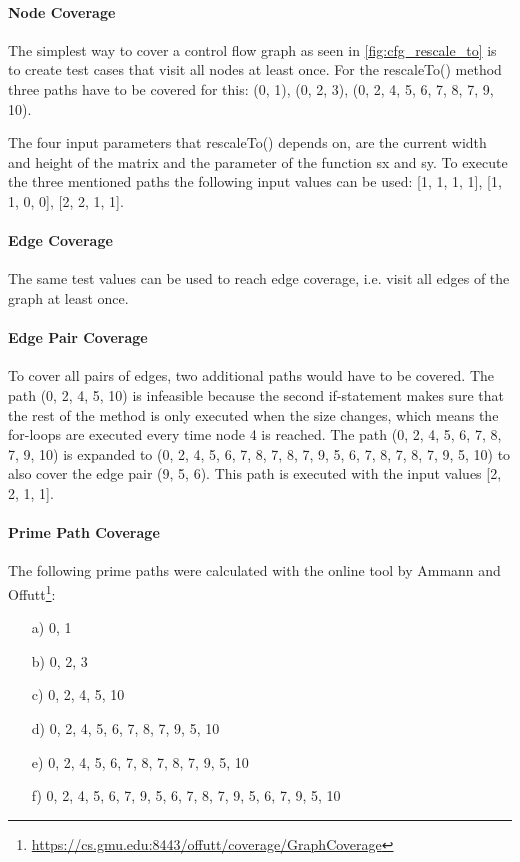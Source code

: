 \documentclass{scrreprt}
\begin{document}
\paragraph{Node Coverage} The simplest way to cover a control flow graph as seen in \vref{fig:cfg_rescale_to} is to create test cases that visit all nodes at least once. For the rescaleTo() method three paths have to be covered for this: (0, 1), (0, 2, 3), (0, 2, 4, 5, 6, 7, 8, 7, 9, 10).

The four input parameters that rescaleTo() depends on, are the current width and height of the matrix and the parameter of the function sx and sy. To execute the three mentioned paths the following input values can be used: [1, 1, 1, 1], [1, 1, 0, 0], [2, 2, 1, 1].

\paragraph{Edge Coverage} The same test values can be used to reach edge coverage, i.e. visit all edges of the graph at least once.

\paragraph{Edge Pair Coverage} To cover all pairs of edges, two additional paths would have to be covered. The path (0, 2, 4, 5, 10) is infeasible because the second if-statement makes sure that the rest of the method is only executed when the size changes, which means the for-loops are executed every time node 4 is reached.
The path (0, 2, 4, 5, 6, 7, 8, 7, 9, 10) is expanded to (0, 2, 4, 5, 6, 7, 8, 7, 8, 7, 9, 5, 6, 7, 8, 7, 8, 7, 9, 5, 10) to also cover the edge pair (9, 5, 6). This path is executed with the input values [2, 2, 1, 1].

\paragraph{Prime Path Coverage} The following prime paths were calculated with the online tool by Ammann and Offutt\footnote{\url{https://cs.gmu.edu:8443/offutt/coverage/GraphCoverage}}:

\begin{itemize}
	\item[a)] 0, 1
	\item[b)] 0, 2, 3
	\item[c)] 0, 2, 4, 5, 10
	\item[d)] 0, 2, 4, 5, 6, 7, 8, 7, 9, 5, 10
	\item[e)] 0, 2, 4, 5, 6, 7, 8, 7, 8, 7, 9, 5, 10
	\item[f)] 0, 2, 4, 5, 6, 7, 9, 5, 6, 7, 8, 7, 9, 5, 6, 7, 9, 5, 10
\end{itemize}
\end{document}
